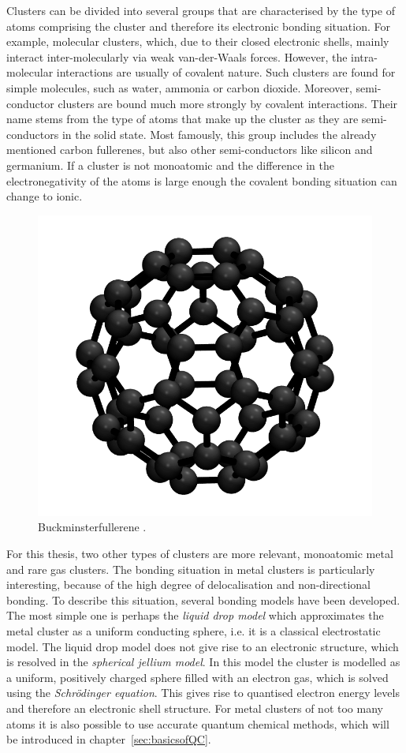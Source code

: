 Clusters can be divided into several groups that are characterised by the type
of atoms comprising the cluster and therefore its electronic bonding situation.
For example, molecular clusters, which, due to their closed electronic shells,
mainly interact inter-molecularly via weak van-der-Waals forces. However, the
intra-molecular interactions are usually of covalent nature. Such clusters are
found for simple molecules, such as water,\autocite{Liu_WaterClusters_1996}
ammonia\autocite{Beu_Structureammoniaclusters_2001} or carbon
dioxide.\autocite{Takeuchi_GeometryOptimizationCarbon_2008} Moreover,
semi-conductor clusters are bound much more strongly by covalent interactions.
Their name stems from the type of atoms that make up the cluster as they are
semi-conductors in the solid state. Most famously, this group includes the
already mentioned carbon
fullerenes\autocite{Kroto_C60Buckminsterfullerene_1985}, but also other
semi-conductors like silicon\autocite{Zhu_Structuresstabilitiessmall_2003a} and
germanium.\autocite{Pacchioni_Silicongermaniumclusters_1986} If a cluster is not
monoatomic and the difference in the electronegativity of the atoms is large
enough the covalent bonding situation can change to ionic.

\begin{figure}[htb]
    \centering
    \includegraphics[width=.5\textwidth]{golddual/C60Ih.png}
    \caption{Buckminsterfullerene .}
    \label{fig:C60example}
\end{figure}

For this thesis, two other types of clusters are more relevant, monoatomic metal
and rare gas clusters. The bonding situation in metal clusters is particularly
interesting, because of the high degree of delocalisation and non-directional
bonding. To describe this situation, several bonding models have been developed.
The most simple one is perhaps the \emph{liquid drop model} which approximates
the metal cluster as a uniform conducting sphere, i.e. it is a classical
electrostatic model. The liquid drop model does not give rise to an electronic
structure, which is resolved in the \textit{spherical jellium model}. In this
model the cluster is modelled as a uniform, positively charged sphere filled
with an electron gas, which is solved using the \textit{Schr\"odinger equation}.
This gives rise to quantised electron energy levels and therefore an electronic
shell structure. For metal clusters of not too many atoms it is also possible to
use accurate quantum chemical methods, which will be introduced in
chapter~\ref{sec:basicsofQC}.

